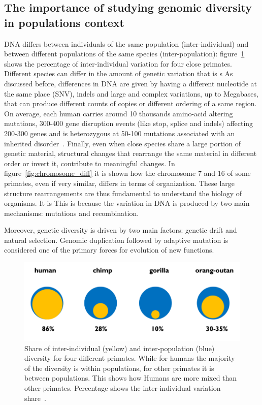 \subsection{The importance of studying genomic diversity in populations context}
DNA differs between individuals of the same population (inter-individual) and between different populations of the same species (inter-population): figure~\ref{fig:pop_diff} shows the percentage of inter-individual variation for four close primates. Different species can differ in the amount of genetic variation that is s As discussed before, differences in DNA are given by having a different nucleotide at the same place (SNV), indels and large and complex variations, up to Megabases, that can produce different counts of copies or different ordering of a same region. \\
On average, each human carries around 10 thousands amino-acid altering mutations, 300-400 gene disruption events (like stop, splice and indels) affecting 200-300 genes and is heterozygous at 50-100 mutations associated with an inherited disorder~\cite{genome_diversity_quintana}. 
Finally, even when close species share a large portion of genetic material, structural changes that rearrange the same material in different order or invert it, contribute to meaningful changes. In figure~\ref{fig:chromosome_diff} it is shown how the chromosome 7 and 16 of some primates, even if very similar, differs in terms of organization. These large structure rearrangements are thus fundamental to understand the biology of organisms.
It is 
This is because the variation in DNA is produced by two main mechanisms: mutations and recombination. 

Moreover, genetic diversity is driven by two main factors: genetic drift and natural selection. Genomic duplication followed by adaptive mutation is considered one of the primary forces for evolution of new functions.
\begin{figure}[!ht]
	\centering
	\includegraphics[width=.8\linewidth]{figures/background/pop_diff.png}
	\caption[Inter-individual and inter-population variation for 4 primate species.]{Share of inter-individual (yellow) and inter-population (blue) diversity for four different primates. While for humans the  majority of the diversity is within populations, for other primates it is between populations. This shows how Humans are more mixed than other primates. Percentage shows the inter-individual variation share~\cite{genome_diversity_quintana}.}
	\label{fig:pop_diff}
\end{figure}


